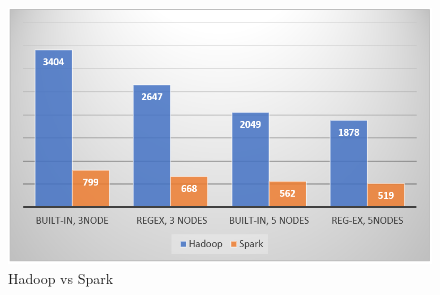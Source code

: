 \begin{figure}[t]
   \centering
   \includegraphics[width=\linewidth]{fig/hvss.png}
    \caption{Hadoop vs Spark}
    \label{fig:hvss}
\end{figure}